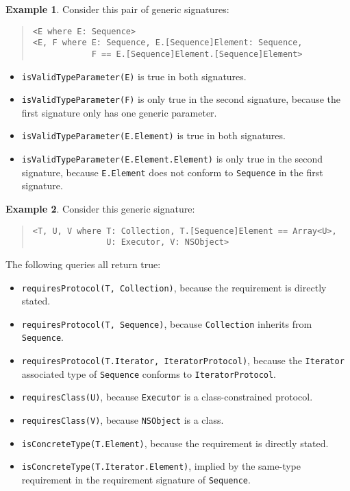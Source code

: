 \documentclass[a4paper,headsepline,bibliography=totoc,toc=flat,fleqn,twoside=semi]{scrbook}
\theoremstyle{definition}
\theoremstyle{definition}
\newtheorem{example}{Example}[chapter]
\theoremstyle{definition}
\begin{document}
\begin{example}
Consider this pair of generic signatures:
\begin{quote}
\begin{verbatim}
<E where E: Sequence>
<E, F where E: Sequence, E.[Sequence]Element: Sequence,
            F == E.[Sequence]Element.[Sequence]Element>
\end{verbatim}
\end{quote}
\begin{itemize}
\item \texttt{isValidTypeParameter(E)} is true in both signatures.
\item \texttt{isValidTypeParameter(F)} is only true in the second signature, because the first signature only has one generic parameter.
\item \texttt{isValidTypeParameter(E.Element)} is true in both signatures.
\item \texttt{isValidTypeParameter(E.Element.Element)} is only true in the second signature, because \texttt{E.Element} does not conform to \texttt{Sequence} in the first signature.
\end{itemize}
\end{example}

\begin{example}
Consider this generic signature:
\begin{quote}
\begin{verbatim}
<T, U, V where T: Collection, T.[Sequence]Element == Array<U>,
               U: Executor, V: NSObject>
\end{verbatim}
\end{quote}
The following queries all return true:
\begin{itemize}
\item \texttt{requiresProtocol(T, Collection)}, because the requirement is directly stated.
\item \texttt{requiresProtocol(T, Sequence)}, because \texttt{Collection} inherits from \texttt{Sequence}.
\item \texttt{requiresProtocol(T.Iterator, IteratorProtocol)}, because the \texttt{Iterator} associated type of \texttt{Sequence} conforms to \texttt{IteratorProtocol}.
\item \texttt{requiresClass(U)}, because \texttt{Executor} is a class-constrained protocol.
\item \texttt{requiresClass(V)}, because \texttt{NSObject} is a class.
\item \texttt{isConcreteType(T.Element)}, because the requirement is directly stated.
\item \texttt{isConcreteType(T.Iterator.Element)}, implied by the same-type requirement in the requirement signature of \texttt{Sequence}.
\end{itemize}
\end{example}
\end{document}
